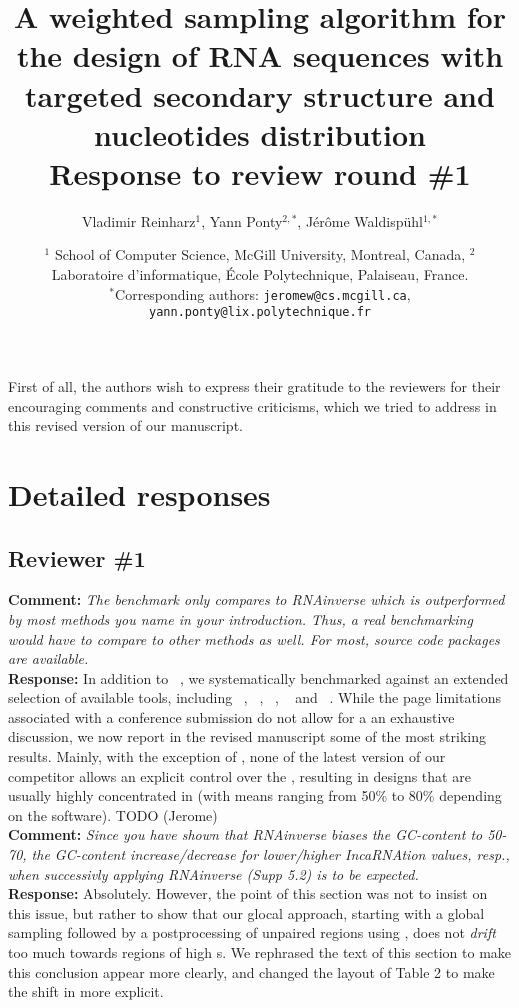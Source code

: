 \documentclass[11pt,hyperref,draft]{article} %
\title{A weighted sampling algorithm for the design of RNA sequences with targeted secondary structure and nucleotides distribution\\Response to review round \#1}
\author{Vladimir Reinharz$^1$, Yann Ponty$^{2,*}$, J\'er\^{o}me Waldisp\"{u}hl$^{1,*}$}
\date{$^1$ School of Computer Science, McGill University, Montreal, Canada, $^2$ Laboratoire d'informatique, \'Ecole Polytechnique, Palaiseau, France.\\ \small $^*$Corresponding authors: \texttt{jeromew@cs.mcgill.ca}, \texttt{yann.ponty@lix.polytechnique.fr}}
\newcommand{\Answer}[1]{\noindent\textsf{\textbf{Response: }}{\sf#1}\\}
\newcommand{\Comment}[1]{\noindent\textsf{\textbf{Comment: }}{\it#1}\\[.5em]}
\begin{document}
\maketitle

First of all, the authors wish to express their gratitude to the reviewers for their encouraging comments and constructive criticisms, which we tried to address in this revised version of our manuscript.


\section{Detailed responses}

\subsection{Reviewer \#1}

\Comment{The benchmark only compares to RNAinverse which is outperformed by most methods you name in your introduction. Thus, a real benchmarking would have to compare to other methods as well. For most, source code packages are available.}
\Answer{In addition to \RNAinverse~\cite{Hofacker:1994}, we systematically benchmarked \ourprog against an extended selection of available tools, including \NUPACK~\cite{Zadeh:2011fk}, \frankenstein~\cite{Lyngso:2012vn},  \RNASSD~\cite{Aguirre-Hernandez:2007kx}, \INFORNA~\cite{Busch:2006uq} and \RNAexinv~\cite{Avihoo:2011fk}.
While the page limitations associated with a conference submission do not allow for a an exhaustive discussion, we now report in the revised manuscript some of the most striking results. Mainly, with the exception of \RNASSD, none of the latest version of our competitor allows an explicit control over the \GCContent, resulting in designs that are usually highly concentrated in \GCContent (with means ranging from 50\% to 80\% depending on the software). TODO (Jerome)
}

\Comment{Since you have shown that RNAinverse biases the GC-content to 50-70, the GC-content increase/decrease for lower/higher IncaRNAtion values, resp., when successivly applying RNAinverse (Supp 5.2) is to be expected.}
\Answer{Absolutely. However, the point of this section was not to insist on this issue, but rather to show that our glocal approach, starting with a global sampling followed by a postprocessing of unpaired regions using \RNAinverse, does not {\em drift} too much towards regions of high \GCContent{}s. We rephrased the text of this section to make this conclusion appear more clearly, and changed the layout of Table 2 to make the shift in \GC more explicit.}
\end{document}
